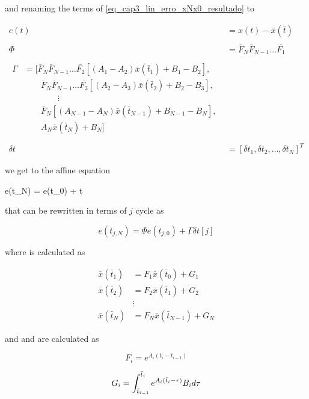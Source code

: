 \noindent
and renaming the terms of \eqref{eq_cap3_lin_erro_xNx0_resultado} to

\noindent
\begin{align}
    e(t) &= x(t) - \bar{x}(\bar{t}) \\ \nonumber \\
    \Phi &= \bar{F}_{N} \bar{F}_{N-1} \ldots \bar{F_1} \\ \nonumber \\
    \label{eq_Phi}
    \begin{split}
        \Gamma &= \Big[ \bar{F}_{N}\bar{F}_{N-1} \ldots \bar{F_2} [(A_1 - A_2) \bar{x}(\bar{t}_1) + B_1 - B_2], \\
        & \qquad \bar{F}_{N}\bar{F}_{N-1} \ldots \bar{F_3} [(A_2 - A_3) \bar{x}(\bar{t}_2) + B_2 - B_3], \\
        & \qquad \qquad \vdots \\
        & \qquad \bar{F}_{N}[(A_{N-1} - A_{N}) \bar{x}(\bar{t}_{N-1}) + B_{N-1} - B_{N}], \\
        & \qquad A_{N} \bar{x}(\bar{t}_{N}) + B_{N}\Big]
    \end{split} \\ \nonumber \\
    \label{eq_Gamma}
    \delta t &= [\delta t_1, \delta t_2, \ldots, \delta t_N]^T
\end{align}

\noindent
we get to the affine equation

\noindent
{}
{
    e(t_N) = \Phi e(t_0) + \Gamma \delta t
}

\noindent
that can be rewritten in terms of $j$ cycle as

\noindent
\begin{equation}
    \label{cap4_eq_lin_proc_result_j}
    e(t_{j,N}) = \Phi e(t_{j,0}) + \Gamma \delta t[j]
\end{equation}

\noindent 
where  is calculated as

\noindent
\begin{align}
    \bar{x}(\bar{t}_1) &= F_1 \bar{x}(\bar{t}_0) + G_1 \\
    \bar{x}(\bar{t}_2) &= F_2 \bar{x}(\bar{t}_1) + G_2 \\
    &\vdots \nonumber \\
    \bar{x}(\bar{t}_N) &= F_{N} \bar{x}(\bar{t}_{N-1}) + G_{N}
\end{align}

\noindent
and  and  are calculated as

\noindent
\begin{equation}
    F_i = e^{A_i(t_i - t_{i-1})}
\end{equation}

\noindent
\begin{equation}
    G_i = \int_{\bar{t}_{i-1}}^{\bar{t}_{i}} {e^{A_{i}(\bar{t}_{i} - \tau)} B_{i} d \tau}
\end{equation}
